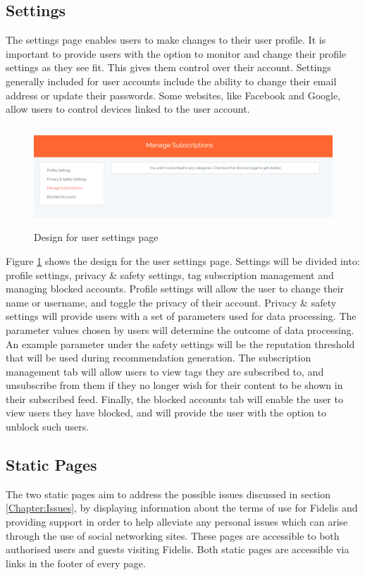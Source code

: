 \subsection{Settings}
The settings page enables users to make changes to their user profile. It is important to provide users with the option to monitor and change their profile settings as they see fit. This gives them control over their account.  Settings generally included for user accounts include the ability to change their email address or update their passwords. Some websites, like Facebook and Google, allow users to control devices linked to the user account.

\begin{figure}[H]
\centering
\includegraphics[height=1.5in]{Images/Design/SettingsPage}
\caption{Design for user settings page}
\label{fig:SettingsPage}
\end{figure}

Figure \ref{fig:SettingsPage} shows the design for the user settings page. Settings will be divided into: profile settings, privacy \& safety settings, tag subscription management and managing blocked accounts. Profile settings will allow the user to change their name or username, and toggle the privacy of their account. Privacy \& safety settings will provide users with a set of parameters used for data processing. The parameter values chosen by users will determine the outcome of data processing. An example parameter under the safety settings will be the reputation threshold that will be used during recommendation generation. The subscription management tab will allow users to view tags they are subscribed to, and unsubscribe from them if they no longer wish for their content to be shown in their subscribed feed. Finally, the blocked accounts tab will enable the user to view users they have blocked, and will provide the user with the option to unblock such users.

\subsection{Static Pages}
The two static pages aim to address the possible issues discussed in section \ref{Chapter:Issues}, by displaying information about the terms of use for Fidelis and providing support in order to help alleviate any personal issues which can arise through the use of social networking sites. These pages are accessible to both authorised users and guests visiting Fidelis. Both static pages are accessible via links in the footer of every page.

